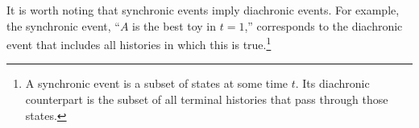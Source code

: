 \documentclass[
11pt,
titlepage,
reqno,
]{article}%
\theoremstyle{definition}
\begin{document}
It is worth noting that synchronic events imply diachronic events.
For example, the synchronic event, ``$A$ is the best toy in $t=1$,'' corresponds to the diachronic event that includes all histories in which this is true.\footnote
{
	A synchronic event is a subset of states at some time $t$. Its diachronic counterpart is the subset of all terminal histories that pass through those states.
}



\end{document}
